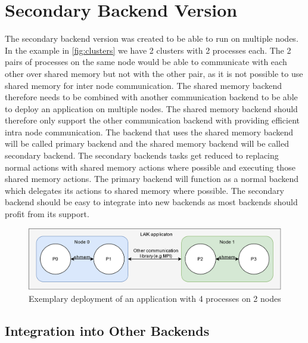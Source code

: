 \section{Secondary Backend Version}

The secondary backend version was created to be able to run on multiple nodes.
In the example in \autoref{fig:clusters} we have 2 clusters with 2 processes each.
The 2 pairs of processes on the same node would be able to communicate with each other over shared memory but not with the other pair, as it is not possible to use shared memory for inter node communication.
The shared memory backend therefore needs to be combined with another communication backend to be able to deploy an application on multiple nodes.
The shared memory backend should therefore only support the other communication backend with providing efficient intra node communication.
The backend that uses the shared memory backend will be called primary backend and the shared memory backend will be called secondary backend.
The secondary backends tasks get reduced to replacing normal actions with shared memory actions where possible and executing those shared memory actions.
The primary backend will function as a normal backend which delegates its actions to shared memory where possible.
The secondary backend should be easy to integrate into new backends as most backends should profit from its support. 

\begin{figure}[h]
	\centering
	\includegraphics[width=0.90\columnwidth]{figures/clusters.png}
	\caption{Exemplary deployment of an application with 4 processes on 2 nodes}
	\label{fig:clusters}
\end{figure}

\subsection{Integration into Other Backends}

